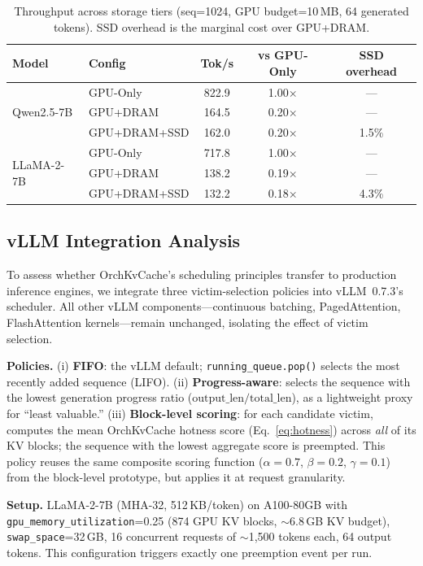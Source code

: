 \documentclass[conference]{IEEEtran}
\begin{document}
\begin{table}[t]
\centering
\caption{Throughput across storage tiers (seq=1024, GPU budget=10\,MB, 64 generated tokens). SSD overhead is the marginal cost over GPU+DRAM.}
\label{tab:tier-throughput}
\small
\begin{tabular}{@{}llccc@{}}
\toprule
Model & Config & Tok/s & vs GPU-Only & SSD overhead \\
\midrule
\multirow{3}{*}{Qwen2.5-7B}
  & GPU-Only       & 822.9 & 1.00$\times$ & --- \\
  & GPU+DRAM       & 164.5 & 0.20$\times$ & --- \\
  & GPU+DRAM+SSD   & 162.0 & 0.20$\times$ & 1.5\% \\
\midrule
\multirow{3}{*}{LLaMA-2-7B}
  & GPU-Only       & 717.8 & 1.00$\times$ & --- \\
  & GPU+DRAM       & 138.2 & 0.19$\times$ & --- \\
  & GPU+DRAM+SSD   & 132.2 & 0.18$\times$ & 4.3\% \\
\bottomrule
\end{tabular}
\end{table}

\subsection{vLLM Integration Analysis}
\label{sec:vllm-integration}

To assess whether OrchKvCache's scheduling principles transfer to production inference engines, we integrate three victim-selection policies into vLLM~0.7.3's scheduler. All other vLLM components---continuous batching, PagedAttention, FlashAttention kernels---remain unchanged, isolating the effect of victim selection.

\textbf{Policies.} (i) \textbf{FIFO}: the vLLM default; \texttt{running\_queue.pop()} selects the most recently added sequence (LIFO). (ii) \textbf{Progress-aware}: selects the sequence with the lowest generation progress ratio ($\text{output\_len} / \text{total\_len}$), as a lightweight proxy for ``least valuable.'' (iii) \textbf{Block-level scoring}: for each candidate victim, computes the mean OrchKvCache hotness score (Eq.~\ref{eq:hotness}) across \emph{all} of its KV blocks; the sequence with the lowest aggregate score is preempted. This policy reuses the same composite scoring function ($\alpha{=}0.7$, $\beta{=}0.2$, $\gamma{=}0.1$) from the block-level prototype, but applies it at request granularity.

\textbf{Setup.} LLaMA-2-7B (MHA-32, 512\,KB/token) on A100-80GB with \texttt{gpu\_memory\_utilization}=0.25 (874 GPU KV blocks, $\sim$6.8\,GB KV budget), \texttt{swap\_space}=32\,GB, 16 concurrent requests of $\sim$1,500 tokens each, 64 output tokens. This configuration triggers exactly one preemption event per run.
\end{document}
